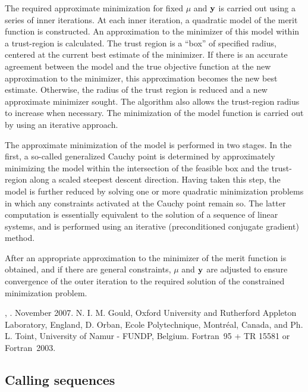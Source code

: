 \documentclass{galahad}
\newcommand{\fullpackagename}{LANC\-E\-LOT\-\_simple}
\begin{document}
The required approximate minimization for fixed $\mu$ and ${\mathbf{y}}$ is 
carried out using a series of inner iterations.  At each inner
iteration, a quadratic model of the merit function is
constructed.  An approximation to the minimizer of this model within a
trust-region is calculated.  The trust region is a ``box'' 
of specified radius, centered at the current best estimate
of the minimizer.  If there is an accurate agreement between the model
and the true objective function at the new approximation to the
minimizer, this approximation becomes the new best estimate.  Otherwise,
the radius of the trust region is reduced and a new approximate
minimizer sought.  The algorithm also allows the trust-region radius to
increase when necessary. The minimization of the model function is
carried out by using an iterative approach.

The approximate minimization of the model is performed in two stages.
In the first, a so-called generalized Cauchy point is determined
by approximately minimizing the model within the intersection of 
the feasible box and the trust-region along a scaled steepest descent 
direction. Having taken this step, the model is further reduced
by solving one or more quadratic minimization problems in which
any constraints activated at the Cauchy point remain so. The latter
computation is essentially equivalent to the solution of a sequence 
of linear systems, and is performed using an iterative (preconditioned
conjugate gradient) method.

After an appropriate approximation to the minimizer of the merit
function is obtained, and if there are general constraints, 
$\mu$ and ${\mathbf{y}}$ are adjusted to ensure
convergence of the outer iteration to the required solution of the
constrained minimization problem.


\galattributes
\galversions{\tt  \fullpackagename\_double},
.
\galdate November 2007.
\galorigin N. I. M. Gould, Oxford University and Rutherford Appleton Laboratory, 
England, D. Orban, Ecole Polytechnique, Montr\'{e}al, Canada, and
Ph. L. Toint, University of Namur - FUNDP, Belgium.
\gallanguage Fortran~95 + TR 15581 or Fortran~2003. 


\galhowto

\subsection{Calling sequences}
\end{document}
